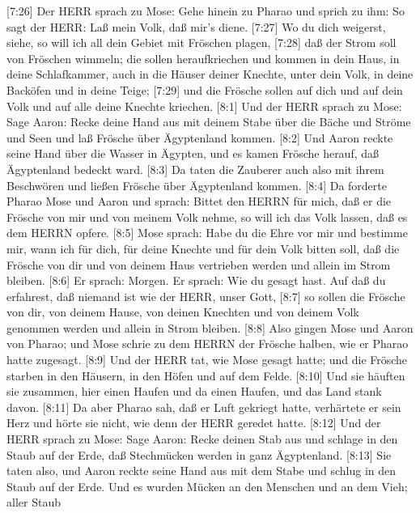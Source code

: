  {[}7:26{]} Der HERR sprach zu Mose: Gehe hinein zu Pharao
und sprich zu ihm: So sagt der HERR: Laß mein Volk, daß mir's diene.
 {[}7:27{]} Wo du dich weigerst, siehe, so will ich all dein
Gebiet mit Fröschen plagen,  {[}7:28{]} daß der Strom soll
von Fröschen wimmeln; die sollen heraufkriechen und kommen in dein Haus,
in deine Schlafkammer, auch in die Häuser deiner Knechte, unter dein
Volk, in deine Backöfen und in deine Teige;  {[}7:29{]} und
die Frösche sollen auf dich und auf dein Volk und auf alle deine Knechte
kriechen.  {[}8:1{]} Und der HERR sprach zu Mose: Sage
Aaron: Recke deine Hand aus mit deinem Stabe über die Bäche und Ströme
und Seen und laß Frösche über Ägyptenland kommen.  {[}8:2{]}
Und Aaron reckte seine Hand über die Wasser in Ägypten, und es kamen
Frösche herauf, daß Ägyptenland bedeckt ward.  {[}8:3{]} Da
taten die Zauberer auch also mit ihrem Beschwören und ließen Frösche
über Ägyptenland kommen.  {[}8:4{]} Da forderte Pharao Mose
und Aaron und sprach: Bittet den HERRN für mich, daß er die Frösche von
mir und von meinem Volk nehme, so will ich das Volk lassen, daß es dem
HERRN opfere.  {[}8:5{]} Mose sprach: Habe du die Ehre vor
mir und bestimme mir, wann ich für dich, für deine Knechte und für dein
Volk bitten soll, daß die Frösche von dir und von deinem Haus vertrieben
werden und allein im Strom bleiben.  {[}8:6{]} Er sprach:
Morgen. Er sprach: Wie du gesagt hast. Auf daß du erfahrest, daß niemand
ist wie der HERR, unser Gott,  {[}8:7{]} so sollen die
Frösche von dir, von deinem Hause, von deinen Knechten und von deinem
Volk genommen werden und allein in Strom bleiben. 
{[}8:8{]} Also gingen Mose und Aaron von Pharao; und Mose schrie zu dem
HERRN der Frösche halben, wie er Pharao hatte zugesagt. 
{[}8:9{]} Und der HERR tat, wie Mose gesagt hatte; und die Frösche
starben in den Häusern, in den Höfen und auf dem Felde. 
{[}8:10{]} Und sie häuften sie zusammen, hier einen Haufen und da einen
Haufen, und das Land stank davon.  {[}8:11{]} Da aber
Pharao sah, daß er Luft gekriegt hatte, verhärtete er sein Herz und
hörte sie nicht, wie denn der HERR geredet hatte. 
{[}8:12{]} Und der HERR sprach zu Mose: Sage Aaron: Recke deinen Stab
aus und schlage in den Staub auf der Erde, daß Stechmücken werden in
ganz Ägyptenland.  {[}8:13{]} Sie taten also, und Aaron
reckte seine Hand aus mit dem Stabe und schlug in den Staub auf der
Erde. Und es wurden Mücken an den Menschen und an dem Vieh; aller Staub
